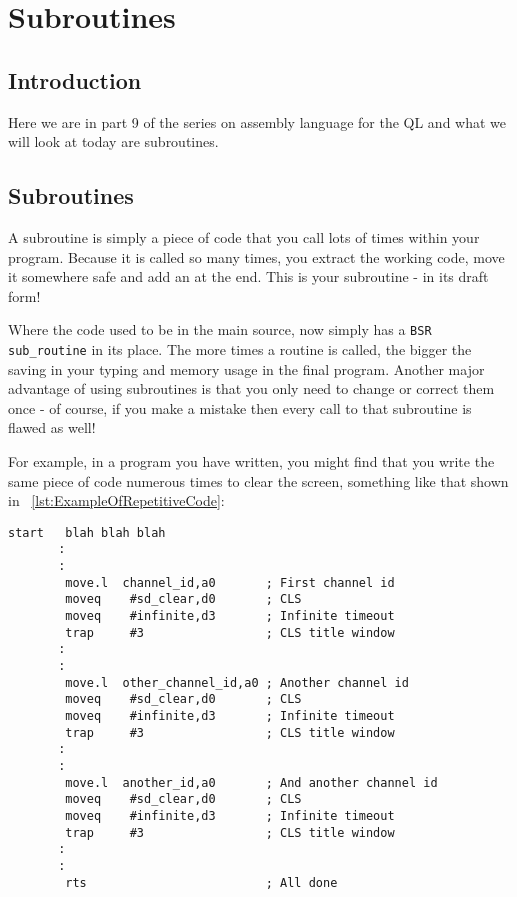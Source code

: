 \chapter{Subroutines}

\section{Introduction}
\label{ch9-intro}%

Here we are in part 9 of the series on assembly language for the QL and what we
    will look at today are subroutines.

\section{Subroutines}
\label{ch9-subroutines}%

A subroutine is simply a piece of code that you call lots of times
    within your program. Because it is called so many times, you extract the
    working code, move it somewhere safe and add an  at the end. This is
    your subroutine -{} in its draft form!

Where the code used to be in the main source, now simply has a 
\lstinline{BSR sub_routine} in its place. The more times a routine is called, the bigger
    the saving in your typing and memory usage in the final program. Another
    major advantage of using subroutines is that you only need to change or
    correct them once -{} of course, if you make a mistake then every call to
    that subroutine is flawed as well!

For example, in a program you have written, you might find that you
    write the same piece of code numerous times to clear the screen, something
    like that shown in \lstlistingname~\ref{lst:ExampleOfRepetitiveCode}:

\begin{lstlisting}[firstnumber=1,caption={Example of Repetitive Code},label={lst:ExampleOfRepetitiveCode}]
    start   blah blah blah
       :
       :
        move.l  channel_id,a0       ; First channel id
        moveq    #sd_clear,d0       ; CLS
        moveq    #infinite,d3       ; Infinite timeout
        trap     #3                 ; CLS title window
       :
       :
        move.l  other_channel_id,a0 ; Another channel id
        moveq    #sd_clear,d0       ; CLS
        moveq    #infinite,d3       ; Infinite timeout
        trap     #3                 ; CLS title window
       :
       :
        move.l  another_id,a0       ; And another channel id
        moveq    #sd_clear,d0       ; CLS
        moveq    #infinite,d3       ; Infinite timeout
        trap     #3                 ; CLS title window
       :
       :
        rts                         ; All done
\end{lstlisting}

